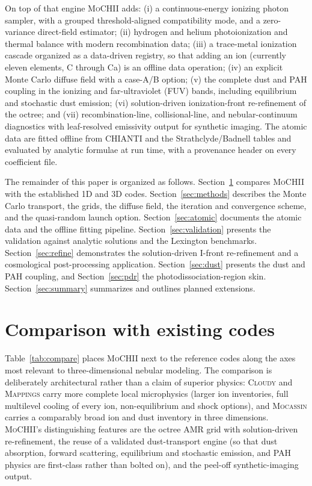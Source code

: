 \documentclass[twocolumn,linenumbers]{aastex702}
\newcommand{\MoCHII}{\textsc{MoCHII}}
\begin{document}
On top of that engine \MoCHII{} adds: (i) a continuous-energy ionizing
photon sampler, with a grouped threshold-aligned compatibility mode, and a
zero-variance direct-field estimator;
(ii) hydrogen and helium photoionization and thermal balance with modern
recombination data; (iii) a trace-metal ionization cascade organized as a
data-driven registry, so that adding an ion (currently eleven elements,
C through Ca) is an offline data operation; (iv) an explicit Monte Carlo
diffuse field with a case-A/B option; (v) the complete dust and PAH
coupling in the ionizing and far-ultraviolet (FUV) bands, including
equilibrium and stochastic dust emission; (vi) solution-driven
ionization-front re-refinement of the octree; and (vii) recombination-line,
collisional-line, and nebular-continuum diagnostics with leaf-resolved
emissivity output for synthetic imaging.  The atomic data are fitted
offline from CHIANTI and the Strathclyde/Badnell tables and evaluated by
analytic formulae at run time, with a provenance header on every
coefficient file.

The remainder of this paper is organized as follows.
Section~\ref{sec:compare} compares \MoCHII{} with the established 1D and
3D codes.  Section~\ref{sec:methods} describes the Monte Carlo transport,
the grids, the diffuse field, the iteration and convergence scheme, and
the quasi-random launch option.  Section~\ref{sec:atomic} documents the
atomic data and the offline fitting pipeline.
Section~\ref{sec:validation} presents the validation against analytic
solutions and the Lexington benchmarks.
Section~\ref{sec:refine} demonstrates the solution-driven I-front
re-refinement and a cosmological post-processing application.
Section~\ref{sec:dust} presents the dust and PAH coupling, and
Section~\ref{sec:pdr} the photodissociation-region skin.
Section~\ref{sec:summary} summarizes and outlines planned extensions.

\section{Comparison with existing codes}
\label{sec:compare}

Table~\ref{tab:compare} places \MoCHII{} next to the reference codes along
the axes most relevant to three-dimensional nebular modeling.  The
comparison is deliberately architectural rather than a claim of superior
physics: \textsc{Cloudy} and \textsc{Mappings} carry more complete local
microphysics (larger ion inventories, full multilevel cooling of every ion,
non-equilibrium and shock options), and \textsc{Mocassin} carries a
comparably broad ion and dust inventory in three dimensions.  \MoCHII{}'s
distinguishing features are the octree AMR grid with solution-driven
re-refinement, the reuse of a validated dust-transport engine (so that
dust absorption, forward scattering, equilibrium and stochastic emission,
and PAH physics are first-class rather than bolted on), and the
peel-off synthetic-imaging output.
\end{document}
